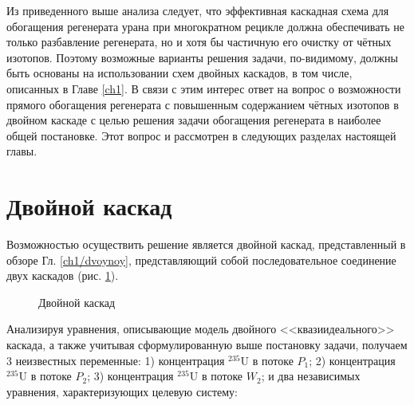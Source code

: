 Из приведенного выше анализа следует, что эффективная каскадная схема для обогащения регенерата урана при многократном рецикле должна обеспечивать не только разбавление регенерата, но и хотя бы частичную его очистку от чётных изотопов. Поэтому возможные варианты решения задачи, по-видимому, должны быть основаны на использовании схем двойных каскадов, в том числе, описанных в Главе \ref{ch1}. В связи с этим интерес ответ на вопрос о возможности прямого обогащения регенерата с повышенным содержанием чётных изотопов в двойном каскаде с целью решения задачи обогащения регенерата в наиболее общей постановке. Этот вопрос и рассмотрен в следующих разделах настоящей главы.



\section{Двойной каскад}\label{sec:ch2/dvoynoy}

Возможностью осуществить решение является двойной каскад, представленный в обзоре Гл. \ref{ch1/dvoynoy}, представляющий собой последовательное соединение двух каскадов (рис. \ref{fig:double_ru}). 

\begin{figure}[ht]
  \caption{Двойной каскад}\label{fig:double_ru}
\end{figure}

Анализируя уравнения, описывающие модель двойного <<квазиидеального>> каскада, а также учитывая сформулированную выше постановку задачи, получаем 3 неизвестных переменные: 1) концентрация $^{235}$U в потоке $P_{1}$; 2) концентрация $^{235}$U в потоке $P_{2}$; 3) концентрация $^{235}$U в потоке $W_{2}$; и два независимых уравнения, характеризующих целевую систему:

